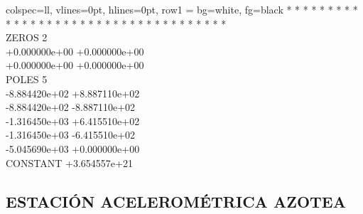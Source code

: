 \begin{table}[H]
\begin{tblr}{
        colspec={ll},
        vlines=0pt,
        hlines=0pt,
        row{1} = {bg=white, fg=black}
    }
    \ttfamily * * * * * * * * * * * * * * * * * * * * * * * * * * * * * * * * * * * * * \\
    \ttfamily ZEROS 2 \\
    \ttfamily +0.000000e+00 +0.000000e+00 \\
    \ttfamily +0.000000e+00 +0.000000e+00 \\
    \ttfamily POLES 5 \\
    \ttfamily -8.884420e+02 +8.887110e+02 \\
    \ttfamily -8.884420e+02 -8.887110e+02 \\
    \ttfamily -1.316450e+03 +6.415510e+02 \\
    \ttfamily -1.316450e+03 -6.415510e+02 \\
    \ttfamily -5.045690e+03 +0.000000e+00 \\
    \ttfamily CONSTANT 	+3.654557e+21 \\
    \end{tblr}
\end{table}

\subsection{ESTACIÓN ACELEROMÉTRICA AZOTEA}
